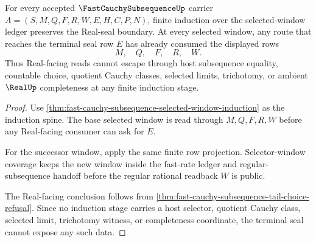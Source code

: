\begin{theorem}
\label{thm:fast-cauchy-subsequence-real-seal-nonescape-induction}
For every accepted $\FastCauchySubsequenceUp$ carrier $A=(S,M,Q,F,R,W,E,H,C,P,N)$, finite induction over the selected-window ledger preserves the Real-seal boundary. At every selected window, any route that reaches the terminal seal row $E$ has already consumed the displayed rows
$$
M,\quad Q,\quad F,\quad R,\quad W .
$$
Thus Real-facing reads cannot escape through host subsequence equality, countable choice, quotient Cauchy classes, selected limits, trichotomy, or ambient $\RealUp$ completeness at any finite induction stage.
\end{theorem}
\begin{proof}
Use \autoref{thm:fast-cauchy-subsequence-selected-window-induction} as the induction spine. The base selected window is read through $M,Q,F,R,W$ before any Real-facing consumer can ask for $E$.

For the successor window, apply the same finite row projection. Selector-window coverage keeps the new window inside the fast-rate ledger and regular-subsequence handoff before the regular rational readback $W$ is public.

The Real-facing conclusion follows from \autoref{thm:fast-cauchy-subsequence-tail-choice-refusal}. Since no induction stage carries a host selector, quotient Cauchy class, selected limit, trichotomy witness, or completeness coordinate, the terminal seal cannot expose any such data.
\end{proof}

